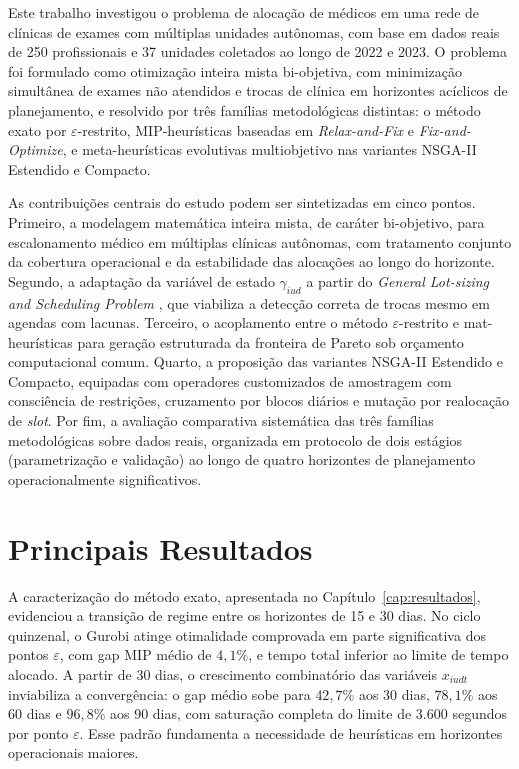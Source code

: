 \label{cap:fechamento}

Este trabalho investigou o problema de alocação de médicos em uma rede de clínicas de exames com múltiplas unidades autônomas, com base em dados reais de 250 profissionais e 37 unidades coletados ao longo de 2022 e 2023. O problema foi formulado como otimização inteira mista bi-objetiva, com minimização simultânea de exames não atendidos e trocas de clínica em horizontes acíclicos de planejamento, e resolvido por três famílias metodológicas distintas: o método exato por $\varepsilon$-restrito, MIP-heurísticas baseadas em \textit{Relax-and-Fix} e \textit{Fix-and-Optimize}, e meta-heurísticas evolutivas multiobjetivo nas variantes NSGA-II Estendido e Compacto.

As contribuições centrais do estudo podem ser sintetizadas em cinco pontos. Primeiro, a modelagem matemática inteira mista, de caráter bi-objetivo, para escalonamento médico em múltiplas clínicas autônomas, com tratamento conjunto da cobertura operacional e da estabilidade das alocações ao longo do horizonte. Segundo, a adaptação da variável de estado $\gamma_{iud}$ a partir do \textit{General Lot-sizing and Scheduling Problem} \cite{Fleischmann_Meyr_1997}, que viabiliza a detecção correta de trocas mesmo em agendas com lacunas. Terceiro, o acoplamento entre o método $\varepsilon$-restrito e mat-heurísticas para geração estruturada da fronteira de Pareto sob orçamento computacional comum. Quarto, a proposição das variantes NSGA-II Estendido e Compacto, equipadas com operadores customizados de amostragem com consciência de restrições, cruzamento por blocos diários e mutação por realocação de \textit{slot}. Por fim, a avaliação comparativa sistemática das três famílias metodológicas sobre dados reais, organizada em protocolo de dois estágios (parametrização e validação) ao longo de quatro horizontes de planejamento operacionalmente significativos.

\section{Principais Resultados}

A caracterização do método exato, apresentada no Capítulo~\ref{cap:resultados}, evidenciou a transição de regime entre os horizontes de 15 e 30 dias. No ciclo quinzenal, o Gurobi atinge otimalidade comprovada em parte significativa dos pontos $\varepsilon$, com gap MIP médio de $4{,}1\%$, e tempo total inferior ao limite de tempo alocado. A partir de 30 dias, o crescimento combinatório das variáveis $x_{iudt}$ inviabiliza a convergência: o gap médio sobe para $42{,}7\%$ aos 30 dias, $78{,}1\%$ aos 60 dias e $96{,}8\%$ aos 90 dias, com saturação completa do limite de 3.600 segundos por ponto $\varepsilon$. Esse padrão fundamenta a necessidade de heurísticas em horizontes operacionais maiores.

